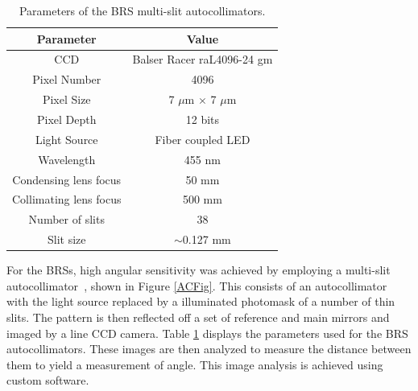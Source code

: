 \documentclass [12pt, proquest]{uwthesis}[2019]
\begin{document}
\begin{table}
\begin{center}
\bgroup
\def\arraystretch{1.5}
\begin{tabular}{| c | c |}
\hline
Parameter & Value\\
\hline \hline
CCD & Balser Racer raL4096-24 gm\\
Pixel Number & 4096\\
Pixel Size & 7 $\mu$m $\times$ 7 $\mu$m\\
Pixel Depth & 12 bits\\
Light Source & Fiber coupled LED\\
Wavelength & 455 nm\\
Condensing lens focus & 50 mm\\
Collimating lens focus & 500 mm\\
Number of slits & 38\\
Slit size & $\sim$0.127 mm\\
\hline
\end{tabular}
\caption[Parameters of the BRS multi-slit autocollimators]{Parameters of the BRS multi-slit autocollimators.}\label{ACTable}
\egroup
\end{center}
\end{table}

For the BRSs, high angular sensitivity was achieved by employing a multi-slit autocollimator~\cite{MSA}, shown in Figure \ref{ACFig}. This consists of an autocollimator with the light source replaced by a illuminated photomask of a number of thin slits. The pattern is then reflected off a set of reference and main mirrors and imaged by a line CCD camera. Table \ref{ACTable} displays the parameters used for the BRS autocollimators. These images are then analyzed to measure the distance between them to yield a measurement of angle. This image analysis is achieved using custom software.~\cite{BRSReadout}
\end{document}
